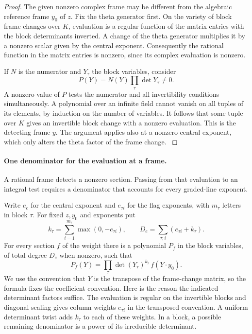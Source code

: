 \begin{proof}
The given nonzero complex frame may be different from the
algebraic reference frame \(y_0\) of \(z\). Fix the theta generator
first. On the variety of block frame changes over \(K\), evaluation
is a regular function of the matrix entries with the block
determinants inverted. A change of the theta generator multiplies
it by a nonzero scalar given by the central exponent. Consequently
the rational function in the matrix entries is nonzero, since
its complex evaluation is nonzero.

If \(N\) is the numerator and \(Y_\tau\) the block variables, consider
\[
 P(Y)=N(Y)\prod_\tau\det Y_\tau\ne0.
\]
A nonzero value of \(P\) tests the numerator and all invertibility conditions simultaneously. A polynomial over an infinite field cannot vanish on
all tuples of its elements, by induction on the number of
variables. It follows that some tuple over \(K\) gives an
invertible block change with a nonzero evaluation. This is the
detecting frame \(y\). The argument applies also at a nonzero
central exponent, which only alters the theta factor of the
frame change.
\label{cor:deep-cover-denominators-2}

\end{proof}

\paragraph{One denominator for the evaluation at a frame.}

A rational frame detects a nonzero section. Passing from that evaluation to an integral test requires a denominator that accounts for every graded-line exponent.

Write \(e_c\) for the central exponent and \(e_{\tau i}\) for the
flag exponents, with \(m_\tau\) letters in block \(\tau\). For fixed
\(z,y_0\) and exponents put
\[
 k_\tau=\sum_{i=1}^{m_\tau}\max(0,-e_{\tau i}),\qquad
 D_e=\sum_{\tau,i}(e_{\tau i}+k_\tau).
\]
For every section \(f\) of the weight there is a polynomial
\(P_f\) in the block variables, of total degree \(D_e\) when
nonzero, such that
\[
 P_f(Y)=\prod_\tau\det(Y_\tau)^{k_\tau}\,f(Y\cdot y_0).
\]
We use the convention that \(Y\) is the transpose of the
frame-change matrix, so the formula fixes the coefficient
convention. Here is the reason the indicated determinant factors
suffice. The evaluation is regular on the invertible blocks and
diagonal scaling gives column weights \(e_{\tau i}\) in the
transposed convention. A uniform determinant twist adds
\(k_\tau\) to each of these weights. In a block, a possible
remaining denominator is a power of its irreducible
determinant.

